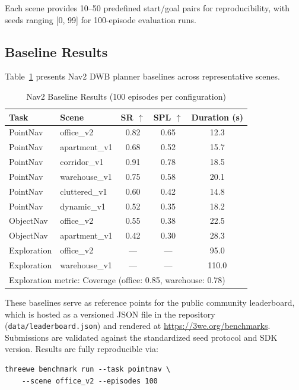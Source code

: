 \documentclass[conference]{IEEEtran}
\begin{document}
Each scene provides 10--50 predefined start/goal pairs for reproducibility, with seeds ranging [0, 99] for 100-episode evaluation runs.

\subsection{Baseline Results}

Table~\ref{tab:baselines} presents Nav2 DWB planner baselines across representative scenes.

\begin{table}[t]
\centering
\caption{Nav2 Baseline Results (100 episodes per configuration)}
\label{tab:baselines}
\scriptsize
\begin{tabular}{@{}llccc@{}}
\toprule
Task & Scene & SR $\uparrow$ & SPL $\uparrow$ & Duration (s) \\
\midrule
PointNav & office\_v2 & 0.82 & 0.65 & 12.3 \\
PointNav & apartment\_v1 & 0.68 & 0.52 & 15.7 \\
PointNav & corridor\_v1 & 0.91 & 0.78 & 18.5 \\
PointNav & warehouse\_v1 & 0.75 & 0.58 & 20.1 \\
PointNav & cluttered\_v1 & 0.60 & 0.42 & 14.8 \\
PointNav & dynamic\_v1 & 0.52 & 0.35 & 18.2 \\
\midrule
ObjectNav & office\_v2 & 0.55 & 0.38 & 22.5 \\
ObjectNav & apartment\_v1 & 0.42 & 0.30 & 28.3 \\
\midrule
Exploration & office\_v2 & --- & --- & 95.0 \\
Exploration & warehouse\_v1 & --- & --- & 110.0 \\
\bottomrule
\multicolumn{5}{l}{\scriptsize Exploration metric: Coverage (office: 0.85, warehouse: 0.78)}
\end{tabular}
\end{table}

These baselines serve as reference points for the public community leaderboard, which is hosted as a versioned JSON file in the repository (\texttt{data/leaderboard.json}) and rendered at \url{https://3we.org/benchmarks}. Submissions are validated against the standardized seed protocol and SDK version. Results are fully reproducible via:

\begin{lstlisting}
threewe benchmark run --task pointnav \
    --scene office_v2 --episodes 100
\end{lstlisting}
\end{document}

